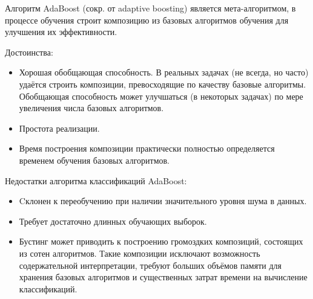 Алгоритм AdaBoost (сокр. от adaptive boosting) является мета-алгоритмом, в процессе обучения 
строит композицию из базовых алгоритмов обучения для улучшения их эффективности.

Достоинства:
\begin{itemize}
 \item Хорошая обобщающая способность. В реальных задачах (не всегда, но часто) удаётся строить композиции, 
превосходящие по качеству базовые алгоритмы. Обобщающая способность может улучшаться (в некоторых задачах) 
по мере увеличения числа базовых алгоритмов.
 \item Простота реализации.
 \item Время построения композиции практически полностью определяется временем обучения базовых алгоритмов.
\end{itemize}


Недостатки алгоритма классификаций AdaBoost:
\begin{itemize}
 \item Cклонен к переобучению при наличии значительного уровня шума в данных.
 \item Требует достаточно длинных обучающих выборок.
 \item Бустинг может приводить к построению громоздких композиций, состоящих из сотен алгоритмов. 
 Такие композиции исключают возможность содержательной интерпретации, требуют больших объёмов памяти 
 для хранения базовых алгоритмов и существенных затрат времени на вычисление классификаций.~\cite{ada_boost}
\end{itemize}